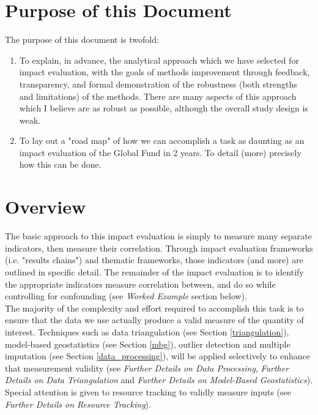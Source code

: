 \documentclass[twocolumn]{bmcart}%
\begin{document}
\section{Purpose of this Document}
The purpose of this document is twofold:

\begin{enumerate}
  \item To explain, in advance, the analytical approach which we have selected for impact evaluation, with the goals of methods improvement through feedback, transparency, and formal demonstration of the robustness (both strengths and limitations) of the methods. There are many aspects of this approach which I believe are as robust as possible, although the overall study design is weak.
  \item To lay out a "road map" of how we can accomplish a task as daunting as an impact evaluation of the Global Fund in 2 years. To detail (more) precisely how this can be done.
\end{enumerate}


\section{Overview}
The basic approach to this impact evaluation is simply to measure many separate indicators, then measure their correlation. Through impact evaluation frameworks (i.e. "results chains") and thematic frameworks, those indicators (and more) are outlined in specific detail. The remainder of the impact evaluation is to identify the appropriate indicators measure correlation between, and do so while controlling for confounding (see \textit{Worked Example} section below). \\

The majority of the complexity and effort required to accomplish this task is to ensure that the data we use actually produce a valid measure of the quantity of interest. Techniques such as data triangulation (see Section \ref{triangulation}), model-based geostatistics (see Section \ref{mbg}), outlier detection and multiple imputation (see Section \ref{data_processing}), will be applied selectively to enhance that measurement validity (see \textit{Further Details on Data Processing}, \textit{Further Details on Data Triangulation} and \textit{Further Details on Model-Based Geostatistics}). Special attention is given to resource tracking to validly measure inputs (see \textit{Further Details on Resource Tracking}).  \\
\end{document}
